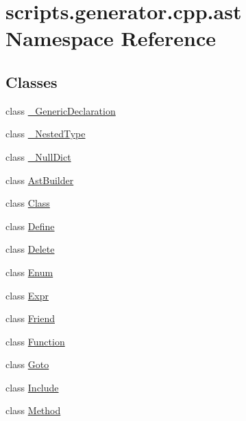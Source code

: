 \hypertarget{namespacescripts_1_1generator_1_1cpp_1_1ast}{}\section{scripts.\+generator.\+cpp.\+ast Namespace Reference}
\label{namespacescripts_1_1generator_1_1cpp_1_1ast}
\subsection*{Classes}
\begin{DoxyCompactItemize}
\item 
class \mbox{\hyperlink{classscripts_1_1generator_1_1cpp_1_1ast_1_1___generic_declaration}{\+\_\+\+Generic\+Declaration}}
\item 
class \mbox{\hyperlink{classscripts_1_1generator_1_1cpp_1_1ast_1_1___nested_type}{\+\_\+\+Nested\+Type}}
\item 
class \mbox{\hyperlink{classscripts_1_1generator_1_1cpp_1_1ast_1_1___null_dict}{\+\_\+\+Null\+Dict}}
\item 
class \mbox{\hyperlink{classscripts_1_1generator_1_1cpp_1_1ast_1_1_ast_builder}{Ast\+Builder}}
\item 
class \mbox{\hyperlink{classscripts_1_1generator_1_1cpp_1_1ast_1_1_class}{Class}}
\item 
class \mbox{\hyperlink{classscripts_1_1generator_1_1cpp_1_1ast_1_1_define}{Define}}
\item 
class \mbox{\hyperlink{classscripts_1_1generator_1_1cpp_1_1ast_1_1_delete}{Delete}}
\item 
class \mbox{\hyperlink{classscripts_1_1generator_1_1cpp_1_1ast_1_1_enum}{Enum}}
\item 
class \mbox{\hyperlink{classscripts_1_1generator_1_1cpp_1_1ast_1_1_expr}{Expr}}
\item 
class \mbox{\hyperlink{classscripts_1_1generator_1_1cpp_1_1ast_1_1_friend}{Friend}}
\item 
class \mbox{\hyperlink{classscripts_1_1generator_1_1cpp_1_1ast_1_1_function}{Function}}
\item 
class \mbox{\hyperlink{classscripts_1_1generator_1_1cpp_1_1ast_1_1_goto}{Goto}}
\item 
class \mbox{\hyperlink{classscripts_1_1generator_1_1cpp_1_1ast_1_1_include}{Include}}
\item 
class \mbox{\hyperlink{classscripts_1_1generator_1_1cpp_1_1ast_1_1_method}{Method}}
\item 

\end{DoxyCompactItemize}
